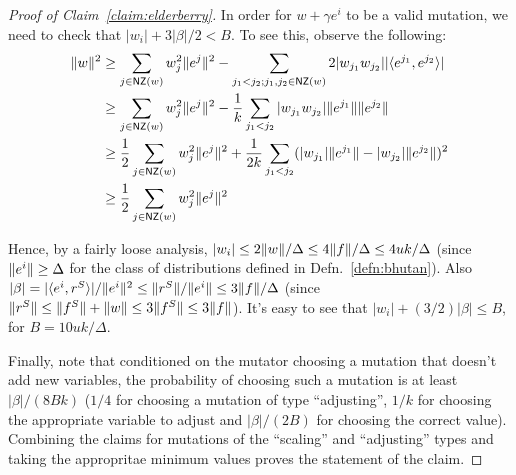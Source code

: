 \begin{proof}[Proof of Claim~\ref{claim:elderberry}]
In order for $w + \gamma e^i$ to be a valid mutation, we need to check that
$|w_i| + 3 |\beta|/2 < B$. To see this, observe the following:
\begin{align*}
\ltwonorm{w}^2 &\geq \sum_{j \in \NZ(w)} w_j^2 \ltwonorm{e^j}^2 - \sum_{j_1 < j_2; j_1,
j_2 \in \NZ(w)} 2 |w_{j_1} w_{j_2}| |\ip{e^{j_1}}{e^{j_2}}| \\
&\geq \sum_{j \in \NZ(w)} w_j^2 \ltwonorm{e^j}^2 - \frac{1}{k} \sum_{j_1 < j_2}
|w_{j_1} w_{j_2}| \ltwonorm{e^{j_1}}\ltwonorm{e^{j_2}} \\
&\geq \frac{1}{2} \sum_{j \in \NZ(w)} w_j^2 \ltwonorm{e^j}^2 + \frac{1}{2k} \sum_{j_1 < j_2}
(|w_{j_1}| \ltwonorm{e^{j_1}} - |w_{j_2}| \ltwonorm{e^{j_2}})^2 \\
&\geq \frac{1}{2} \sum_{j \in \NZ(w)} w_j^2 \ltwonorm{e^j}^2 %
\end{align*}

\noindent Hence, by a fairly loose analysis, $|w_i|  \leq 2 \Vert w \Vert/\Delta
\leq 4 \Vert f \Vert/\Delta \leq 4uk/\Delta$ (since $\Vert e^i \Vert \geq \Delta$
for the class of distributions defined in Defn.~\ref{defn:bhutan}). Also
$|\beta| = |\langle e^i, r^S \rangle|/\Vert e^i \Vert^2 \leq \Vert r^S \Vert/\Vert e^i \Vert
\leq 3 \Vert f \Vert/\Delta$ (since $\Vert r^S \Vert \leq \Vert f^S \Vert +
\Vert w \Vert \leq 3 \Vert f^S \Vert \leq 3 \Vert f \Vert$). It's easy to see that
$|w_i| + (3/2) |\beta| \leq B$, for $B = 10 uk/\Delta$.

Finally, note that conditioned on the mutator choosing a mutation that doesn't
add new variables, the probability of choosing such a mutation is at least
$|\beta|/(8Bk)$ ($1/4$ for choosing a mutation of type ``adjusting'', $1/k$ for
choosing the appropriate variable to adjust and $|\beta|/(2B)$ for choosing the
correct value). Combining the claims for mutations of the ``scaling'' and
``adjusting'' types and taking the appropritae minimum values proves the
statement of the claim.
\end{proof}
